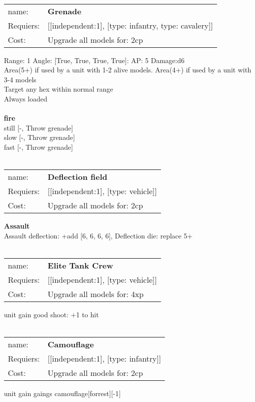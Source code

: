 \ \\
\begin{tabular}{ll}
name: & {\bf Grenade } \\
Requiers: & [[independent:1], [type: infantry, type: cavalery]] \\
Cost: & Upgrade all models for: 2cp \\
\end{tabular}



Range: 1  Angle: [True, True, True, True]: AP: 5 Damage:d6 \\
Area(5+) if used by a unit with 1-2 alive models. Area(4+) if used by a unit with 3-4 models\\ 
Target any hex within normal range\\ 
Always loaded\\ 







\ \\ {\bf fire } \\
still [-, Throw grenade] \\
slow [-, Throw grenade] \\
fast [-, Throw grenade] \\

\ \\
\begin{tabular}{ll}
name: & {\bf Deflection field } \\
Requiers: & [[independent:1], [type: vehicle]] \\
Cost: & Upgrade all models for: 2cp \\
\end{tabular}





{\bf Assault} \ \\
Assault deflection: +add [6, 6, 6, 6], Deflection die: replace 5+
\\ 




\ \\
\begin{tabular}{ll}
name: & {\bf Elite Tank Crew } \\
Requiers: & [[independent:1], [type: vehicle]] \\
Cost: & Upgrade all models for: 4xp \\
\end{tabular}

unit gain good shoot: +1 to hit\\ 









\ \\
\begin{tabular}{ll}
name: & {\bf Camouflage } \\
Requiers: & [[independent:1], [type: infantry]] \\
Cost: & Upgrade all models for: 2cp \\
\end{tabular}

unit gain gaings camouflage[forrest][-1]\\ 









